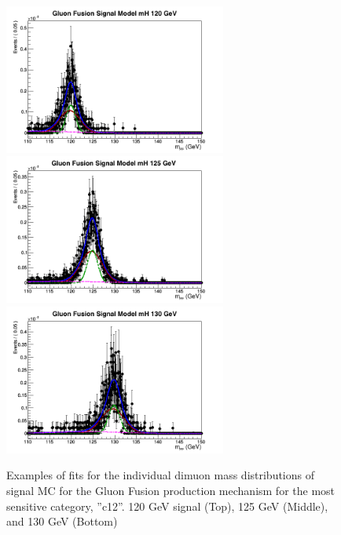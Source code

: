  \begin{figure}[hbp]
     \centering
     \includegraphics[width=0.65\textwidth]{figures/signal_model/AppendixBdt/GluGlu/120/fit_mh_120_GluGlu_cat12.png}\\
     \includegraphics[width=0.65\textwidth]{figures/signal_model/AppendixBdt/GluGlu/125/fit_mh_125_GluGlu_cat12.png}\\
     \includegraphics[width=0.65\textwidth]{figures/signal_model/AppendixBdt/GluGlu/130/fit_mh_130_GluGlu_cat12.png}
     \caption{Examples of fits for the individual dimuon mass distributions of signal MC for the Gluon Fusion production mechanism for the most sensitive category, ''c12''. 120 GeV signal (Top), 125 GeV (Middle), and 130 GeV (Bottom)}
     \label{fig:higgs_signalmodel_c12gluglu120125130}
 \end{figure}

